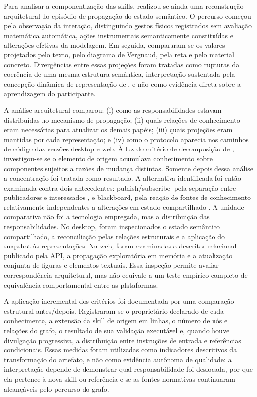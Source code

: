 \documentclass[preprint,12pt,authoryear]{elsarticle}
\begin{document}
Para analisar a componentização das skills, realizou-se ainda uma reconstrução arquitetural do episódio de propagação do estado semântico. O percurso começou pela observação da interação, distinguindo gestos físicos registrados sem avaliação matemática automática, ações instrumentais semanticamente constituídas e alterações efetivas da modelagem. Em seguida, compararam-se os valores projetados pelo texto, pelo diagrama de Vergnaud, pela reta e pelo material concreto. Divergências entre essas projeções foram tratadas como rupturas da coerência de uma mesma estrutura semântica, interpretação sustentada pela concepção dinâmica de representação de \citet{vergnaud1998representation}, e não como evidência direta sobre a aprendizagem do participante.

A análise arquitetural comparou: (i) como as responsabilidades estavam distribuídas no mecanismo de propagação; (ii) quais relações de conhecimento eram necessárias para atualizar os demais papéis; (iii) quais projeções eram mantidas por cada representação; e (iv) como o protocolo aparecia nos caminhos de código das versões desktop e web. À luz do critério de decomposição de \citet{parnas1972criteria}, investigou-se se o elemento de origem acumulava conhecimento sobre componentes sujeitos a razões de mudança distintas. Somente depois dessa análise a concentração foi tratada como resultado. A alternativa identificada foi então examinada contra dois antecedentes: publish/subscribe, pela separação entre publicadores e interessados \citep{eugster2003many}, e blackboard, pela reação de fontes de conhecimento relativamente independentes a alterações em estado compartilhado \citep{nii1986blackboard}. A unidade comparativa não foi a tecnologia empregada, mas a distribuição das responsabilidades. No desktop, foram inspecionados o estado semântico compartilhado, a reconciliação pelas relações estruturais e a aplicação do snapshot às representações. Na web, foram examinados o descritor relacional publicado pela API, a propagação exploratória em memória e a atualização conjunta de figuras e elementos textuais. Essa inspeção permite avaliar correspondência arquitetural, mas não equivale a um teste empírico completo de equivalência comportamental entre as plataformas.

A aplicação incremental dos critérios foi documentada por uma comparação estrutural antes/depois. Registraram-se o proprietário declarado de cada conhecimento, a extensão da skill de origem em linhas, o número de nós e relações do grafo, o resultado de sua validação executável e, quando houve divulgação progressiva, a distribuição entre instruções de entrada e referências condicionais. Essas medidas foram utilizadas como indicadores descritivos da transformação do artefato, e não como evidência autônoma de qualidade: a interpretação depende de demonstrar qual responsabilidade foi deslocada, por que ela pertence à nova skill ou referência e se as fontes normativas continuaram alcançáveis pelo percurso do grafo.
\end{document}
